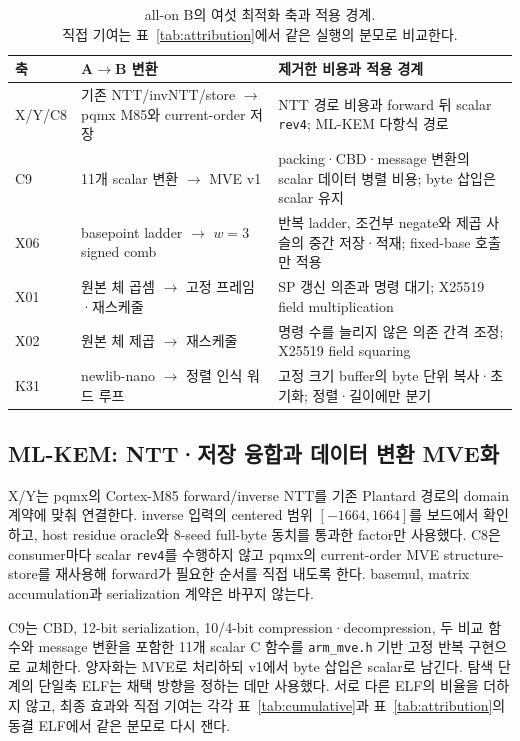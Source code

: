 \documentclass[runningheads,orivec]{llncs}
\begin{document}
\begin{table}[t]\centering\footnotesize
\caption{all-on B의 여섯 최적화 축과 적용 경계.\protect\\ 직접 기여는
표~\ref{tab:attribution}에서 같은 실행의 분모로 비교한다.}
\label{tab:adopted}
\renewcommand{\arraystretch}{1.25}
\begin{tabularx}{\textwidth}{@{}>{\raggedright\arraybackslash}p{1.55cm}>{\raggedright\arraybackslash}p{4.0cm}>{\raggedright\arraybackslash}X@{}}\toprule
축 & A$\to$B 변환 & 제거한 비용과 적용 경계\\\midrule
X/Y/C8 & 기존 NTT/invNTT/store $\to$ pqmx M85와 current-order 저장 & NTT 경로 비용과 forward 뒤 scalar \texttt{rev4}; ML-KEM 다항식 경로\\\addlinespace[2pt]
C9 & 11개 scalar 변환 $\to$ MVE v1 & packing·CBD·message 변환의 scalar 데이터 병렬 비용; byte 삽입은 scalar 유지\\\addlinespace[2pt]
X06 & basepoint ladder $\to$ $w=3$ signed comb & 반복 ladder, 조건부 negate와 제곱 사슬의 중간 저장·적재; fixed-base 호출만 적용\\\addlinespace[2pt]
X01 & 원본 체 곱셈 $\to$ 고정 프레임·재스케줄 & SP 갱신 의존과 명령 대기; X25519 field multiplication\\\addlinespace[2pt]
X02 & 원본 체 제곱 $\to$ 재스케줄 & 명령 수를 늘리지 않은 의존 간격 조정; X25519 field squaring\\\addlinespace[2pt]
K31 & newlib-nano $\to$ 정렬 인식 워드 루프 & 고정 크기 buffer의 byte 단위 복사·초기화; 정렬·길이에만 분기\\\bottomrule
\end{tabularx}
\end{table}

\subsection{ML-KEM: NTT·저장 융합과 데이터 변환 MVE화}

X/Y는 pqmx의 Cortex-M85 forward/inverse NTT를 기존 Plantard 경로의 domain 계약에
맞춰 연결한다. inverse 입력의 centered 범위 $[-1664,1664]$를 보드에서 확인하고,
host residue oracle와 8-seed full-byte 동치를 통과한 factor만 사용했다. C8은
consumer마다 scalar \texttt{rev4}를 수행하지 않고 pqmx의 current-order MVE
structure-store를 재사용해 forward가 필요한 순서를 직접 내도록 한다. basemul,
matrix accumulation과 serialization 계약은 바꾸지 않는다.

C9는 CBD, 12-bit serialization, 10/4-bit compression·decompression, 두 비교 함수와
message 변환을 포함한 11개 scalar C 함수를 \texttt{arm\_mve.h} 기반 고정 반복
구현으로 교체한다. 양자화는 MVE로 처리하되 v1에서 byte 삽입은 scalar로 남긴다.
탐색 단계의 단일축 ELF는 채택 방향을 정하는 데만 사용했다. 서로 다른 ELF의 비율을
더하지 않고, 최종 효과와 직접 기여는 각각 표~\ref{tab:cumulative}과
표~\ref{tab:attribution}의 동결 ELF에서 같은 분모로 다시 잰다.
\end{document}
